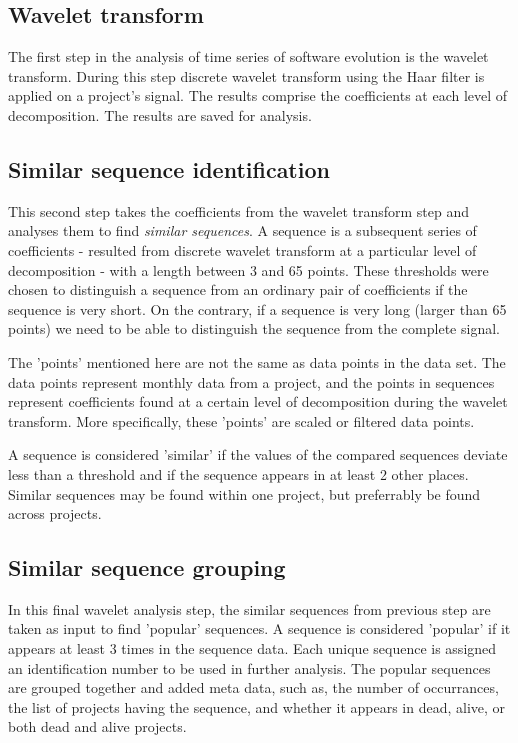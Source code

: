 \subsection{Wavelet transform}
The first step in the analysis of time series of software evolution is the
wavelet transform. During this step discrete wavelet transform using the Haar
filter is applied on a project's signal. The results comprise the coefficients
at each level of decomposition. The results are saved for analysis.

\subsection{Similar sequence identification}
This second step takes the coefficients from the wavelet transform step and
analyses them to find \emph{similar sequences}\rm. A sequence is a subsequent
series of coefficients - resulted from discrete wavelet transform at a
particular level of decomposition - with a length between 3 and 65 points.
These thresholds were chosen to distinguish a sequence from an ordinary pair of
coefficients if the sequence is very short. On the contrary, if a sequence is
very long (larger than 65 points) we need to be able to distinguish the
sequence from the complete signal.

The 'points' mentioned here are not the same as data points in the data set.
The data points represent monthly data from a project, and the points in
sequences represent coefficients found at a certain level of decomposition
during the wavelet transform. More specifically, these 'points' are scaled or
filtered data points.

A sequence is considered 'similar' if the values of the compared sequences
deviate less than a threshold and if the sequence appears in at least 2 other
places. Similar sequences may be found within one project, but preferrably be
found across projects.

\subsection{Similar sequence grouping}
In this final wavelet analysis step, the similar sequences from previous step
are taken as input to find 'popular' sequences. A sequence is considered
'popular' if it appears at least 3 times in the sequence data. Each unique
sequence is assigned an identification number to be used in further analysis.
The popular sequences are grouped together and added meta data, such as, the
number of occurrances, the list of projects having the sequence, and whether it
appears in dead, alive, or both dead and alive projects.


